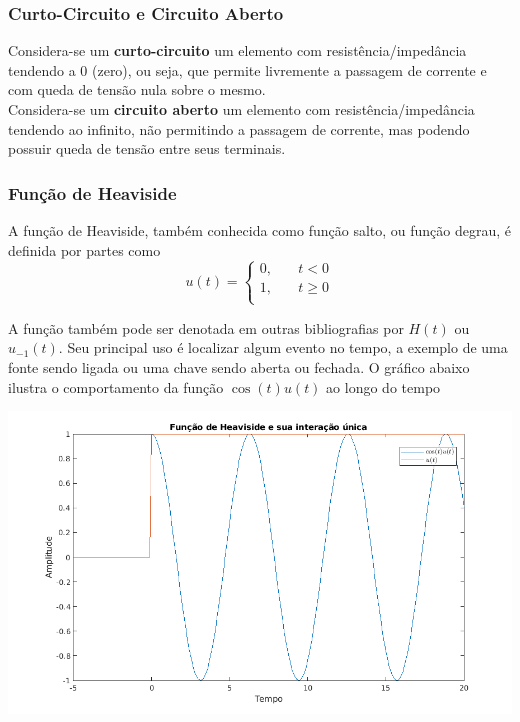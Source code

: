 \documentclass{article}
\numberwithin{equation}{section}
\begin{document}
    \subsubsection{Curto-Circuito e Circuito Aberto}
    Considera-se um \textbf{curto-circuito} um elemento com resistência/impedância tendendo a 0 (zero), ou seja, que permite livremente a passagem de corrente e com queda de tensão nula sobre o mesmo. \\
    \indent Considera-se um \textbf{circuito aberto} um elemento com resistência/impedância tendendo ao infinito, não permitindo a passagem de corrente, mas podendo possuir queda de tensão entre seus terminais.

    \subsubsection{Função de Heaviside}
    A função de Heaviside, também conhecida como função salto, ou função degrau, é definida por partes como
    $$ u(t) =
    \begin{cases}
        0, &\quad t<0 \\
        1, &\quad t\geqslant 0 \\
    \end{cases}
    $$

    A função também pode ser denotada em outras bibliografias por $H(t)$ ou $u_{-1}(t)$. Seu principal uso é localizar algum evento no tempo, a exemplo de uma fonte sendo ligada ou uma chave sendo aberta ou fechada. O gráfico abaixo ilustra o comportamento da função $\cos (t)u(t)$ ao longo do tempo

    \begin{center}
        \includegraphics[width=\textwidth]{img/cos(t).png}
    \end{center}
\end{document}
